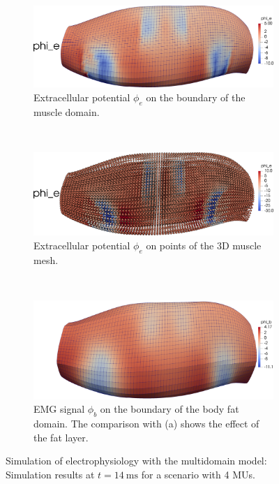 \begin{figure}
  \centering%
  \begin{subfigure}[t]{\textwidth}%
    \centering%
    \includegraphics[width=\textwidth]{images/results/application/multidomain_4mus_body.png}%
    \caption{Extracellular potential $\phi_e$ on the boundary of the muscle domain.}%
    \label{fig:multidomain_4mus_body}%
  \end{subfigure} \\
  \begin{subfigure}[t]{\textwidth}%
    \centering%
    \includegraphics[width=\textwidth]{images/results/application/multidomain_4mus_phi_e_points.png}%
    \caption{Extracellular potential $\phi_e$ on points of the 3D muscle mesh.}%
    \label{fig:multidomain_4mus_phi_e_points}%
  \end{subfigure} \\
  \begin{subfigure}[t]{\textwidth}%
    \centering%
    \includegraphics[width=\textwidth]{images/results/application/multidomain_4mus_emg.png}%
    \caption{EMG signal $\phi_b$ on the boundary of the body fat domain. The comparison with (a) shows the effect of the fat layer.}%
    \label{fig:multidomain_4mus_emg}%
  \end{subfigure}
  \caption{Simulation of electrophysiology with the multidomain model: Simulation results at $t=\SI{14}{\ms}$ for a scenario with 4 MUs.}%
  \label{fig:multidomain_4mus_2}%
\end{figure}%



